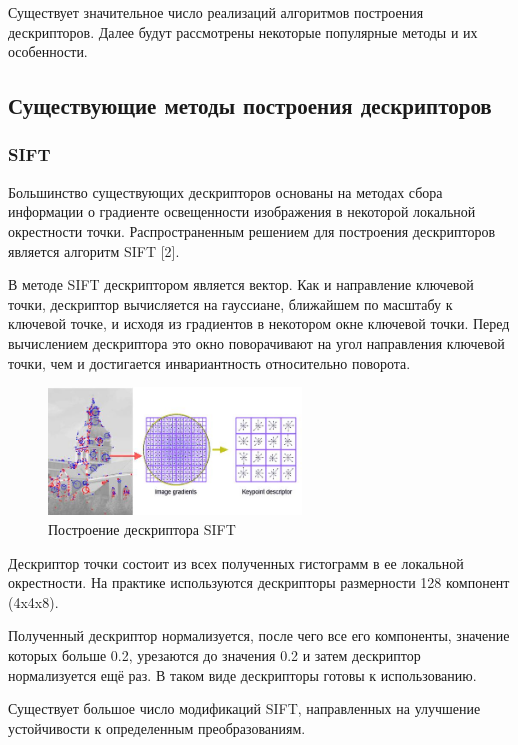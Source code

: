 {{	Существует значительное число реализаций алгоритмов построения дескрипторов. Далее будут рассмотрены некоторые популярные методы и их особенности.
	
\newpage
\subsection{Существующие методы построения дескрипторов}{
	
	\subsubsection{SIFT}{
	Большинство существующих дескрипторов основаны на методах сбора информации о градиенте освещенности изображения в некоторой локальной окрестности точки. 
	Распространенным решением для построения дескрипторов является алгоритм SIFT [2]. 
	
	В методе SIFT дескриптором является вектор. Как и направление ключевой точки, дескриптор вычисляется на гауссиане, ближайшем по масштабу к ключевой точке, и исходя из градиентов в некотором окне ключевой точки. Перед вычислением дескриптора это окно поворачивают на угол направления ключевой точки, чем и достигается инвариантность относительно поворота.
	
	\begin{figure}[H]
		\centering                             
		\includegraphics[width=0.6\textwidth,keepaspectratio]{daisy/SIFT.jpg}       
		\centering\caption{ Построение дескриптора SIFT }
		\label{gradient_example}                           
	\end{figure}    
	
	Дескриптор точки состоит из всех полученных гистограмм в ее локальной окрестности. На практике используются дескрипторы размерности 128 компонент (4x4x8).
	
	Полученный дескриптор нормализуется, после чего все его компоненты, значение которых больше 0.2, урезаются до значения 0.2 и затем дескриптор нормализуется ещё раз. В таком виде дескрипторы готовы к использованию.
	
	Существует большое число модификаций SIFT, направленных на улучшение устойчивости к определенным преобразованиям. 
	}
}}}
